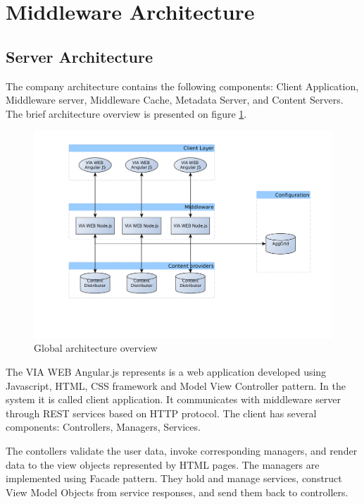 \section{Middleware Architecture}

\subsection{Server Architecture}

The company architecture contains the following components: Client Application, Middleware server, Middleware Cache, Metadata Server, and Content Servers. The brief architecture overview is presented on figure \ref{fig:arch_overview}. 


\begin{figure}[h]
    \centering
	\includegraphics[width=\textwidth]{images/thesis_global_architecture_existing.png}
    \caption{Global architecture overview}
    \label{fig:arch_overview}
\end{figure}


The VIA WEB Angular.js represents is a web application developed using Javascript, HTML, CSS framework and Model View Controller pattern. In the system it is called client application. It communicates with middleware server through REST services based on HTTP protocol. The client has several components: Controllers, Managers, Services. 

The contollers validate the user data, invoke corresponding managers, and render data to the view objects represented by HTML pages. The managers are implemented using Facade pattern\cite{DesignPatterns}. They hold and manage services, construct View Model Objects from service responses, and send them back to controllers. 

